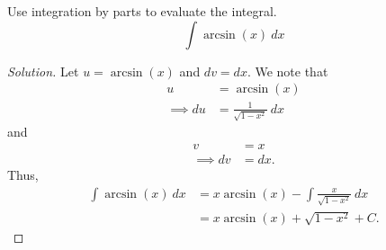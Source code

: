 \documentclass[compacto,10pt,comentarios]{aleph-notas}
\begin{document}
\begin{ejer}
    Use integration by parts to evaluate the integral.
    $$
        \int \arcsin(x) ~ dx
    $$
\end{ejer}
\begin{proof}[Solution]
    Let $u = \arcsin(x)$ and $dv = dx$. We note that
    \begin{align*}
        u & = \arcsin(x) \\ 
        \implies du & = \frac{1}{\sqrt{1-x^{2}}} ~ dx
    \end{align*}
    and
    \begin{align*}     
        v & = x \\ 
        \implies dv & = dx.
    \end{align*}
    Thus,
    \begin{align*}
        \int \arcsin(x) ~ dx
        & = x \arcsin(x) - \int \frac{x}{\sqrt{1 - x^{2}}}~dx \\
        & =  x \arcsin(x) + \sqrt{1 - x^{2}} + C .
    \end{align*}
\end{proof}

\end{document}
